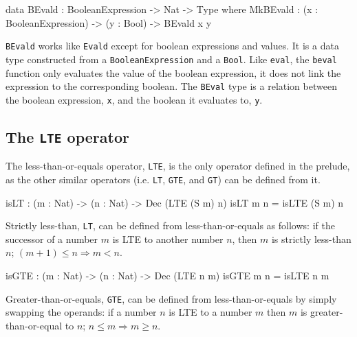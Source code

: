         \newpage
        
        \begin{code}[caption={\texttt{BEvald} as defined in the \Idris model}]
data BEvald : BooleanExpression -> Nat -> Type where
    MkBEvald : (x : BooleanExpression) -> (y : Bool) -> BEvald x y
        \end{code}
    
        \texttt{BEvald} works like \texttt{Evald} except for boolean expressions and values. It is a data type constructed from a \texttt{BooleanExpression} and a \texttt{Bool}. Like \texttt{eval}, the \texttt{beval} function only evaluates the value of the boolean expression, it does not link the expression to the corresponding boolean. The \texttt{BEval} type is a relation between the boolean expression, \texttt{x}, and the boolean it evaluates to, \texttt{y}.
        
    \subsection{The \texttt{LTE} operator}\label{des:tp:lte}
        The less-than-or-equals operator, \texttt{LTE}, is the only operator defined in the \Idris prelude, as the other similar operators (i.e. \texttt{LT}, \texttt{GTE}, and \texttt{GT}) can be defined from it.
        
        \begin{code}[caption={\texttt{LT} can be defined based on \texttt{LTE}}]
        isLT : (m : Nat) -> (n : Nat) -> Dec (LTE (S m) n)
        isLT m n = isLTE (S m) n
        \end{code}
        
        Strictly less-than, \texttt{LT}, can be defined from less-than-or-equals as follows: if the successor of a number $m$ is LTE to another number $n$, then $m$ is strictly less-than $n$; $(m + 1) \leq n \Rightarrow m < n$.
        
        \begin{code}[caption={\texttt{GTE} can be defined based on \texttt{LTE}}]
        isGTE : (m : Nat) -> (n : Nat) -> Dec (LTE n m)
        isGTE m n = isLTE n m
        \end{code}
        
        Greater-than-or-equals, \texttt{GTE}, can be defined from less-than-or-equals by simply swapping the operands: if a number $n$ is LTE to a number $m$ then $m$ is greater-than-or-equal to $n$; $n \leq m \Rightarrow m \geq n$.
        
